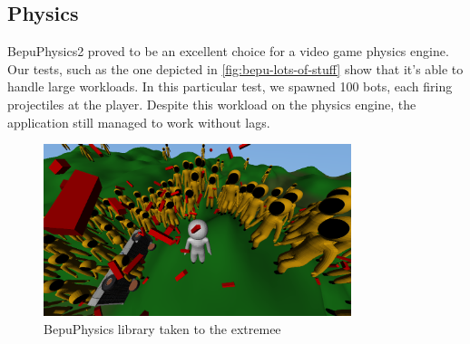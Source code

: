 \subsection{Physics}\label{subsec:physics}
BepuPhysics2 proved to be an excellent choice for a video game physics engine.
Our tests, such as the one depicted in \autoref{fig:bepu-lots-of-stuff} show that it's able to handle large workloads.
In this particular test, we spawned 100 bots, each firing projectiles at the player.
Despite this workload on the physics engine, the application still managed to work without lags.
\begin{figure}[!htb]
    \centering
    \includegraphics[width=0.8\textwidth]{chapters/results/sections/gameplay/resources/lots-of-stuff.png}
    \caption{BepuPhysics library taken to the extremee}
    \label{fig:bepu-lots-of-stuff}
\end{figure}